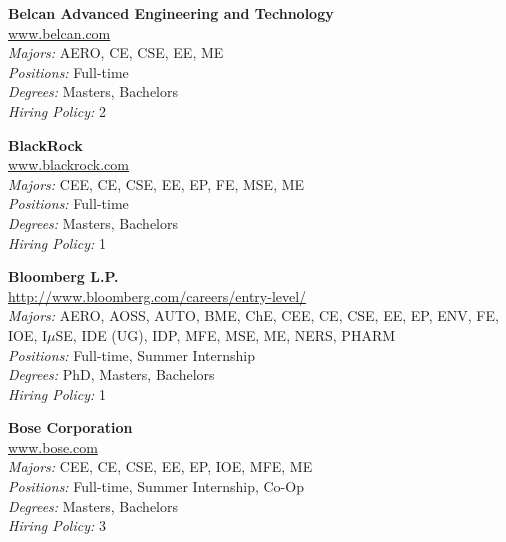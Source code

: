 \documentclass{article}
\begin{document}
\begin{center}
\begin{multicols}{3}
\begin{minipage}{.9\columnwidth}{\Large\bf Belcan Advanced Engineering and Technology }\\
	\url{www.belcan.com}\\
	\emph{Majors:} AERO, CE, CSE, EE, ME\\
	\emph{Positions:} Full-time\\
	\emph{Degrees:} Masters, Bachelors\\
	\emph{Hiring Policy:} 2\\
\end{minipage}
 
\begin{minipage}{.9\columnwidth}{\Large\bf BlackRock }\\
	\url{www.blackrock.com}\\
	\emph{Majors:} CEE, CE, CSE, EE, EP, FE, MSE, ME\\
	\emph{Positions:} Full-time\\
	\emph{Degrees:} Masters, Bachelors\\
	\emph{Hiring Policy:} 1\\
\end{minipage}
 
\begin{minipage}{.9\columnwidth}{\Large\bf Bloomberg L.P. }\\
	\url{http://www.bloomberg.com/careers/entry-level/}\\
	\emph{Majors:} AERO, AOSS, AUTO, BME, ChE, CEE, CE, CSE, EE, EP, ENV, FE, IOE, I$\mu$SE, IDE (UG), IDP, MFE, MSE, ME, NERS, PHARM\\
	\emph{Positions:} Full-time, Summer Internship\\
	\emph{Degrees:} PhD, Masters, Bachelors\\
	\emph{Hiring Policy:} 1\\
\end{minipage}
 
\begin{minipage}{.9\columnwidth}{\Large\bf Bose Corporation }\\
	\url{www.bose.com}\\
	\emph{Majors:} CEE, CE, CSE, EE, EP, IOE, MFE, ME\\
	\emph{Positions:} Full-time, Summer Internship, Co-Op\\
	\emph{Degrees:} Masters, Bachelors\\
	\emph{Hiring Policy:} 3\\
\end{minipage}
 

\end{multicols}
\end{center}
\end{document}
